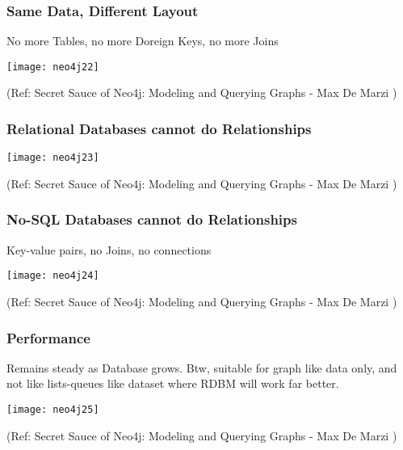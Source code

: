 \begin{frame}[fragile]\frametitle{Same Data, Different Layout}
No more Tables, no more Doreign Keys, no more Joins
\begin{center}
\texttt{[image: neo4j22]}
\end{center}	    

{\tiny (Ref: Secret Sauce of Neo4j: Modeling and Querying Graphs
 - Max De Marzi )}

\end{frame}

\begin{frame}[fragile]\frametitle{Relational Databases cannot do Relationships}

\begin{center}
\texttt{[image: neo4j23]}
\end{center}	    

{\tiny (Ref: Secret Sauce of Neo4j: Modeling and Querying Graphs
 - Max De Marzi )}

\end{frame}

\begin{frame}[fragile]\frametitle{No-SQL Databases cannot do Relationships}
Key-value pairs, no Joins, no connections

\begin{center}
\texttt{[image: neo4j24]}
\end{center}	    

{\tiny (Ref: Secret Sauce of Neo4j: Modeling and Querying Graphs
 - Max De Marzi )}

\end{frame}




\begin{frame}[fragile]\frametitle{Performance}
Remains steady as Database grows. Btw, suitable for graph like data only, and not like lists-queues like dataset where RDBM will work far better.

\begin{center}
\texttt{[image: neo4j25]}
\end{center}	    

{\tiny (Ref: Secret Sauce of Neo4j: Modeling and Querying Graphs
 - Max De Marzi )}

\end{frame}

